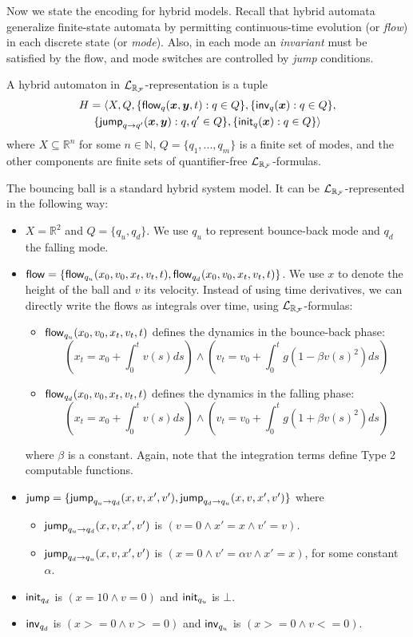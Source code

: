 Now we state the encoding for hybrid models. Recall that hybrid automata generalize finite-state
automata by permitting continuous-time evolution (or {\em flow}) in each discrete state (or {\em mode}). 
Also, in each mode an {\em invariant} must be satisfied by the flow, and mode switches are controlled
by {\em jump} conditions.
\begin{definition}\label{lrf-definition}
A hybrid automaton in $\mathcal{L}_{\mathbb{R}_{\mathcal{F}}}$-representation is a tuple
\begin{multline*}
H = \langle X, Q, \{{\flow}_q(\vec x, \vec y, t): q\in Q\},\{\inv_q(\vec x): q\in Q\},\\
\{\jump_{q\rightarrow q'}(\vec x, \vec y): q,q'\in Q\},\{\init_q(\vec x): q\in Q\}\rangle
\end{multline*}
where $X\subseteq \mathbb{R}^n$ for some $n\in \mathbb{N}$, $Q=\{q_1,...,q_m\}$ is a finite set of modes, and the other components are finite sets of quantifier-free $\mathcal{L}_{\mathbb{R}_{\mathcal{F}}}$-formulas.
\end{definition}
\begin{example}
The bouncing ball is a standard hybrid system model. It can be $\mathcal{L}_{\mathbb{R}_{\mathcal{F}}}$-represented in the following way:
\begin{itemize}
\item $X = \mathbb{R}^2$ and $Q = \{q_u, q_d\}$. We use $q_u$ to represent bounce-back mode and $q_d$ the falling mode.
\item $\mathsf{flow} = \{\mathsf{flow}_{q_u}(x_0, v_0, x_t, v_t, t), \mathsf{flow}_{q_d}(x_0, v_0, x_t, v_t, t)\}$. We use $x$ to denote the height of the ball and $v$ its velocity. Instead of using time derivatives, we can directly write the flows as integrals over time, using $\mathcal{L}_{\mathbb{R}_{\mathcal{F}}}$-formulas:
\begin{itemize}
\item $\mathsf{flow}_{q_u}(x_0, v_0, x_t, v_t, t)$ defines the dynamics in the bounce-back phase:
$$(x_t = x_0 + \int_0^{t} v(s) ds) \wedge (v_t = v_0 + \int_0^t g(1-\beta v(s)^2) ds)$$
\item $\mathsf{flow}_{q_d}(x_0, v_0, x_t, v_t, t)$ defines the dynamics in the falling phase:
$$(x_t = x_0 + \int_0^{t} v(s) ds) \wedge (v_t = v_0 + \int_0^t g(1+\beta v(s)^2) ds)$$
\end{itemize}where
$\beta$ is a constant. Again, note that the integration terms define Type 2 computable functions.
\item $\mathsf{jump} = \{\mathsf{jump}_{q_u \rightarrow q_d} (x, v, x', v'), \mathsf{jump}_{q_d \rightarrow q_u} (x, v, x', v')\}$ where
\begin{itemize}
\item $\mathsf{jump}_{q_u \rightarrow q_d} (x, v, x', v')$ is $(v= 0 \wedge x' = x \wedge v' = v)$.
\item $\mathsf{jump}_{q_d \rightarrow q_u} (x, v, x', v')$ is $(x= 0 \wedge v' = \alpha v\wedge x'=x)$,  for some constant $\alpha$.
\end{itemize}
\item $\mathsf{init}_{q_d}$ is $(x=10 \wedge v=0)$ and $\mathsf{init}_{q_u}$ is $\bot$.
\item $\mathsf{inv}_{q_d}$ is $(x>=0 \wedge v>=0)$ and $\mathsf{inv}_{q_u}$ is $(x>=0 \wedge v<=0)$.
\end{itemize}
\end{example}

